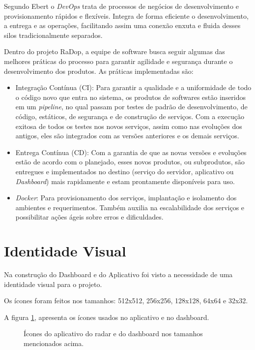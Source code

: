 Segundo Ebert \cite{ebert2016devops} o \textit{DevOps} trata de processos de negócios de desenvolvimento e provisionamento rápidos e flexíveis. Integra de forma eficiente o desenvolvimento, a entrega e as operações, facilitando assim uma conexão enxuta e fluida desses silos tradicionalmente separados.

Dentro do projeto RaDop, a equipe de software busca seguir algumas das melhores práticas do processo para garantir agilidade e segurança durante o desenvolvimento dos produtos. As práticas implementadas são:
\begin{itemize}
    \item Integração Contínua (CI): Para garantir a qualidade e a uniformidade de todo o código novo que entra no sistema, os produtos de softwares estão inseridos em um \textit{pipeline}, no qual passam por testes de padrão de desenvolvimento, de código, estáticos, de segurança e de construção de serviços. Com a execução exitosa de todos os testes nos novos serviços, assim como nas evoluções dos antigos, eles são integrados com as versões anteriores e os demais serviços.
    \item Entrega Contínua (CD): Com a garantia de que as novas versões e evoluções estão de acordo com o planejado, esses novos produtos, ou subprodutos, são entregues e implementados no destino (serviço do servidor, aplicativo ou \textit{Dashboard}) mais rapidamente e estam prontamente disponíveis para uso.
    \item \textit{Docker}: Para provisionamento dos serviços, implantação e isolamento dos ambientes e requerimentos. Também auxilia na escalabilidade dos serviços e possibilitar ações ágeis sobre erros e dificuldades.
\end{itemize}

\section{Identidade Visual}

Na construção do Dashboard e do Aplicativo foi visto a necessidade de uma identidade visual para o projeto. 

Os ícones foram feitos nos tamanhos: 512x512, 256x256, 128x128, 64x64 e 32x32.

A figura \ref{fig:identidade_visual}, apresenta os ícones usados no aplicativo e no dashboard.

\begin{figure}[H]
	\caption{\label{fig:identidade_visual} Ícones do aplicativo do radar e do dashboard nos tamanhos mencionados acima.}
\end{figure}

